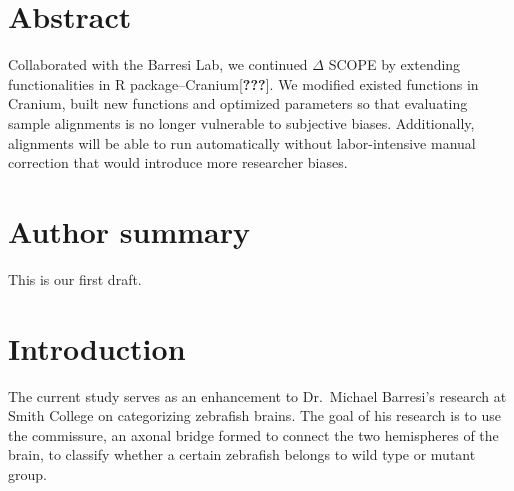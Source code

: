 \documentclass[10pt,letterpaper]{article}
\newcommand{\getIndex}[2]{
  \ForEach{,}{\IfEq{#1}{\thislevelitem}{\number\thislevelcount\ExitForEach}{}}{#2}
}
\newcommand{\getAff}[1]{
  \getIndex{#1}{}
}
\begin{document}
\vspace*{0.2in}

\section*{Abstract}
Collaborated with the Barresi Lab, we continued \(\Delta\) SCOPE by
extending functionalities in R package--Cranium{[}{\textbf{???}}{]}. We
modified existed functions in Cranium, built new functions and optimized
parameters so that evaluating sample alignments is no longer vulnerable
to subjective biases. Additionally, alignments will be able to run
automatically without labor-intensive manual correction that would
introduce more researcher biases.

\section*{Author summary}
This is our first draft.

\linenumbers

\hypertarget{introduction}{%
\section{Introduction}\label{introduction}}

The current study serves as an enhancement to Dr.~Michael Barresi's
research at Smith College on categorizing zebrafish brains. The goal of
his research is to use the commissure, an axonal bridge formed to
connect the two hemispheres of the brain, to classify whether a certain
zebrafish belongs to wild type or mutant group.
\end{document}
